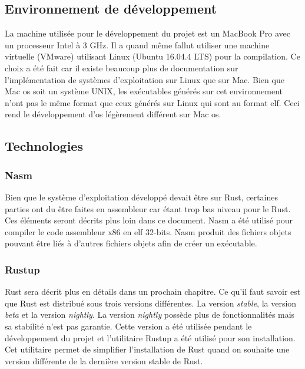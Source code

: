 
\subsection{Environnement de développement}
La machine utilisée pour le développement du projet est un MacBook Pro avec un
processeur Intel à 3 GHz. Il a quand même fallut utiliser une machine virtuelle
(VMware) utilisant Linux (Ubuntu 16.04.4 LTS) pour la compilation. Ce choix a été
fait car il existe beaucoup plus de documentation sur l'implémentation de systèmes
d'exploitation sur Linux que sur Mac. Bien que Mac \acrshort{os} soit un système UNIX, les
exécutables générés sur cet environnement n'ont pas le même format que ceux générés
sur Linux qui sont au format \acrshort{elf}. Ceci rend le développement d'\acrshort{os} légèrement
différent sur Mac \acrshort{os}.


\subsection{Technologies}
\label{technologies}
\subsubsection{Nasm}
Bien que le système d'exploitation développé devait être sur Rust, certaines parties
ont du être faites en assembleur car étant trop bas niveau pour le Rust. Ces éléments
seront décrits plus loin dans ce document. Nasm a été  utilisé pour compiler le
code assembleur x86 en \acrshort{elf} 32-bits. Nasm produit des fichiers objets pouvant être
liés à d'autres fichiers objets afin de créer un exécutable. \\

\subsubsection{Rustup}
Rust sera décrit plus en détails dans un prochain chapitre. Ce qu'il faut savoir
est que Rust est distribué sous trois versions différentes. La version \textit{stable},
la version \textit{beta} et la version \textit{nightly}. La version \textit{nightly}
possède plus de fonctionnalités mais sa stabilité n'est pas garantie. Cette version
a été utilisée pendant le développement du projet et l'utilitaire Rustup a été utilisé
pour son installation. Cet utilitaire permet de simplifier l'installation de Rust
quand on souhaite une version différente de la dernière version stable de Rust. \\

